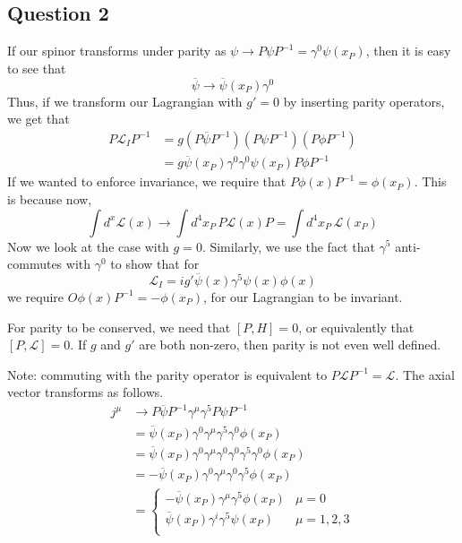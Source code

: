 \documentclass[11pt, oneside]{article}   	%
\theoremstyle{slanted}
\begin{document}
\subsection*{Question 2}
If our spinor transforms under parity as $ \psi \to P \psi P ^{- 1} = \gamma ^  0 \psi \left( x_ P  \right)  $, 
then it is easy to see that 
\[
	\overline{ \psi } \to \overline{\psi } \left( x _ P   \right) \gamma ^  0 
\] Thus, 
if we transform our Lagrangian with $ g' = 0 $  by inserting 
parity operators,
we get that 
\begin{align*}
	P \mathcal{ L } _ I P ^{ - 1 } &=  
	g \left( P \overline{ \psi } P ^{ - 1 }  \right) \left( P 
	\psi P ^{ - 1 } \right)  \left( P \phi P ^{ -1 }  \right)  
	\\
				       &=  g \overline{ \psi } \left( x _P  \right) 
				       \gamma ^ 0 \gamma ^  0 \psi \left( x _ P  \right)  
				       P \phi P ^{ - 1 } 
\end{align*}
If we wanted to enforce 
invariance, we require that $ P \phi \left( x  \right)  P ^{-1 }  = \phi \left( x _ P   \right)  $. This is because now, 
\[
	\int d ^ x \mathcal{ L }\left( x  \right)  
	\to \int d ^ 4 x_ P \, P \mathcal{ L }\left( x  \right)   P 
	= \int d ^ 4 x _ P \, \mathcal{ L } \left( x _ P  \right)  
\] 
Now we look at the case with $ g  =0 $. 
Similarly, we use the fact that $ \gamma ^ 5 $ anti-commutes 
with $ \gamma ^  0$  to show that for  
\[
	\mathcal{ L } _ I  = i g' \overline{ \psi } \left( x  \right)
	\gamma ^ 5 \psi \left( x  \right)  \phi \left(  x  \right) 
\] we require $ O \phi \left( x  \right)  P ^{ - 1 }  =  - \phi \left( x _ P  \right)  $, 
for our Lagrangian to be invariant. 

For parity to be conserved, 
we need that $ \left[  P , H  \right]   = 0 $, 
or equivalently that $ \left[  P , \mathcal{ L }  \right]  =0  $. 
If $ g $ and $ g ' $ are both non-zero, 
then parity is not even well defined. 

Note: commuting with the parity operator is equivalent to $ P \mathcal{ L } P ^{ - 1}  = 
\mathcal{ L } $. 
The axial vector transforms as follows. 
\begin{align*}
	j ^ \mu & \to P \overline{\psi  } P^{ - 1 } \gamma ^ \mu \gamma ^ 5 P \psi P ^{ -  1} \\
		&=  \overline{ \psi } \left( x _ P  \right)  \gamma ^ 0 
		\gamma ^ \mu \gamma ^ 5 \gamma ^  0 \phi \left( x _ P  \right)  \\
		&=  \overline{ \psi } \left( x _ P  \right)  \gamma ^  0 
		\gamma ^ \mu \gamma ^  0 \gamma ^ 0 \gamma ^ 5 \gamma ^   0 \phi 
		\left(  x _ P  \right)  \\ 
		&=   - \overline{ \psi } \left( x _ P  \right)  
		\gamma ^  0 \gamma ^ \mu \gamma ^  0 \gamma ^ 5 \phi \left( x_ P  \right) \\ 
		&=  \begin{cases}
			- \overline{ \psi } \left( x _ P  \right)  \gamma ^ \mu \gamma ^ 5 
			\phi \left( x _ P  \right)  &  \mu  = 0 \\
			\overline{ \psi } \left( x _ P  \right)  
			\gamma ^ i \gamma ^ 5 \psi \left( x _ P  \right) 
						    & \mu  = 1 ,2 , 3\\
		\end{cases} 
\end{align*}
\end{document}
